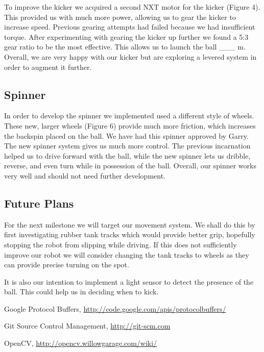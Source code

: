 \documentclass[12pt, a4paper, titlepage]{article}
\begin{document}
To improve the kicker we acquired a second NXT motor for the kicker (Figure
4). This provided us with much more power, allowing us to gear the kicker to
increase speed. Previous gearing attempts had failed because we had insufficient
torque. After experimenting with gearing the kicker up further we found a 5:3
gear ratio to be the most effective. This allows us to launch the ball \_\_\_ m.
Overall, we are very happy with our kicker but are exploring a levered system in
order to augment it further.

\subsection{Spinner}

In order to develop the spinner we implemented used a different style of wheels.
These new, larger wheels (Figure 6) provide much more friction, which increases
the backspin placed on the ball. We have had this spinner approved by Garry.
The new spinner system gives us much more control. The previous incarnation
helped us to drive forward with the ball, while the new spinner lets us dribble,
reverse, and even turn while in possession of the ball. Overall, our spinner
works very well and should not need further development.

\subsection{Future Plans}

For the next milestone we will target our movement system. We shall do this
by first investigating rubber tank tracks which would provide better grip,
hopefully stopping the robot from slipping while driving. If this does not
sufficiently improve our robot we will consider changing the tank tracks to
wheels as they can provide precise turning on the spot.

It is also our intention to implement a light sensor to detect the presence of
the ball. This could help us in deciding when to kick.

\newpage

\setcounter{section}{5}
\begin{thebibliography}{9}

	Google Protocol Buffers,
	\url{http://code.google.com/apis/protocolbuffers/}

	Git Source Control Management,
	\url{http://git-scm.com}

	OpenCV,
	\url{http://opencv.willowgarage.com/wiki/}

\end{thebibliography}
\end{document}
